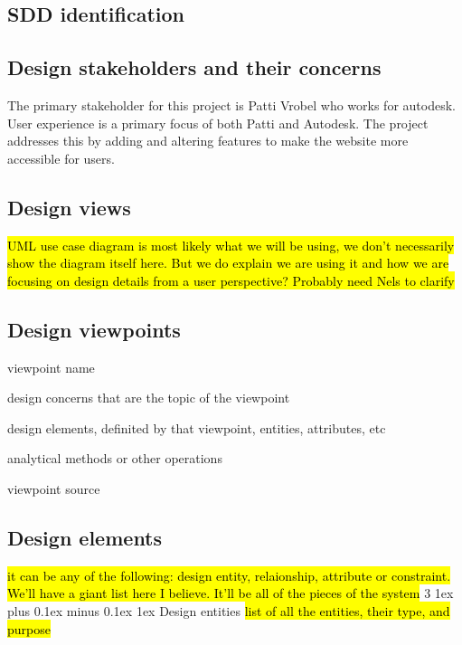\documentclass[letterpaper, 10pt, draftclsnofoot, compsoc, onecolumn]{IEEEtran}
\makeatletter
\def\subsubsection{\@startsection{subsubsection}%
                                 {3}%
                                 {\z@}%
                                 {1ex plus 0.1ex minus 0.1ex}%
                                 {1ex}%
                                 {\normalfont\normalsize}}%
\makeatother
\begin{document}
\subsection{SDD identification}
	\begin{description}
	\item{}
	\end{description}
\subsection{Design stakeholders and their concerns}
	The primary stakeholder for this project is Patti Vrobel who works for autodesk. User experience is a primary focus of both Patti and Autodesk. The project addresses this by adding and altering features to make the website more accessible for users.

\subsection{Design views}
	\hl{UML use case diagram is most likely what we will be using, we don't necessarily show the diagram itself here. But we do explain we are using it and how we are focusing on design details from a user perspective? Probably need Nels to clarify}
\subsection{Design viewpoints}
	\begin{description}
	\item{viewpoint name}
	\item{design concerns that are the topic of the viewpoint}
	\item{design elements, definited by that viewpoint, entities, attributes, etc}
	\item{analytical methods or other operations}
	\item{viewpoint source}
	\end{description}
\subsection{Design elements}
	\hl{it can be any of the following: design entity, relaionship, attribute or constraint. We'll have a giant list here I believe. It'll be all of the pieces of the system}
\subsubsection{Design entities}
	\hl{list of all the entities, their type, and purpose}
\end{document}
